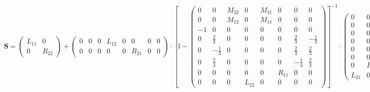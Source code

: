 \[ \mathbf{S} = \left(\begin{smallmatrix} L_{11} & 0 \\ 0 & R_{22} \end{smallmatrix}\right) + \left(\begin{smallmatrix} 0 & 0 & 0 & L_{12} & 0 & 0 & 0 & 0 \\ 0 & 0 & 0 & 0 & 0 & R_{21} & 0 & 0 \end{smallmatrix}\right) \cdot \left[ \mathbb{I}  - \left(\begin{smallmatrix} 0 & 0 & M_{22} & 0 & M_{21} & 0 & 0 & 0 \\ 0 & 0 & M_{12} & 0 & M_{11} & 0 & 0 & 0 \\ -1 & 0 & 0 & 0 & 0 & 0 & 0 & 0 \\ 0 & \frac{2}{3} & 0 & 0 & 0 & 0 & \frac{2}{3} & -\frac{1}{3} \\ 0 & -\frac{1}{3} & 0 & 0 & 0 & 0 & \frac{2}{3} & \frac{2}{3} \\ 0 & \frac{2}{3} & 0 & 0 & 0 & 0 & -\frac{1}{3} & \frac{2}{3} \\ 0 & 0 & 0 & 0 & 0 & R_{11} & 0 & 0 \\ 0 & 0 & 0 & L_{22} & 0 & 0 & 0 & 0 \end{smallmatrix}\right) \right]^{-1} \cdot\left(\begin{smallmatrix} 0 & 0 \\ 0 & 0 \\ 0 & 0 \\ 0 & 0 \\ 0 & 0 \\ 0 & 0 \\ 0 & R_{12} \\ L_{21} & 0 \end{smallmatrix}\right) \]
